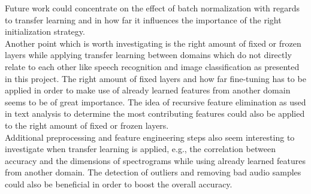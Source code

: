 \documentclass{article}
\theoremstyle{definition}
\theoremstyle{remark}
\begin{document}
Future work could concentrate on the effect of batch normalization with regards to transfer learning and in how far it influences the importance of the right initialization strategy.\\ 
Another point which is worth investigating is the right amount of fixed or frozen layers while applying transfer learning between domains which do not directly relate to each other like speech recognition and image classification as presented in this project. The right amount of fixed layers and how far fine-tuning has to be applied in order to make use of already learned features from another domain seems to be of great importance. The idea of recursive feature elimination as used in text analysis to determine the most contributing features could also be applied to the right amount of fixed or frozen layers.\\
Additional preprocessing and feature engineering steps also seem interesting to investigate when transfer learning is applied, e.g., the correlation between accuracy and the dimensions of spectrograms while using already learned features from another domain. The detection of outliers and removing bad audio samples could also be beneficial in order to boost the overall accuracy.









\end{document}
